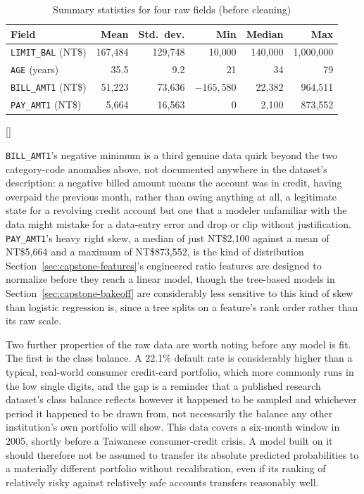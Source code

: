 \documentclass[../ai_in_finance]{subfiles}
\begin{document}
\begin{table}[htbp]
\centering
\begin{lrbox}{\bookmeasuredbox}
\begin{tabular}{lrrrrr}
\toprule
Field & Mean & Std.\ dev. & Min & Median & Max \\
\midrule
\texttt{LIMIT\_BAL} (NT\$) & 167{,}484 & 129{,}748 & 10{,}000 & 140{,}000 & 1{,}000{,}000 \\
\texttt{AGE} (years) & 35.5 & 9.2 & 21 & 34 & 79 \\
\texttt{BILL\_AMT1} (NT\$) & 51{,}223 & 73{,}636 & $-165{,}580$ & 22{,}382 & 964{,}511 \\
\texttt{PAY\_AMT1} (NT\$) & 5{,}664 & 16{,}563 & 0 & 2{,}100 & 873{,}552 \\
\bottomrule
\end{tabular}
\end{lrbox}
\ifdim\wd\bookmeasuredbox<0.65\linewidth
\setlength{\bookcapwidth}{0.65\linewidth}
\else
\setlength{\bookcapwidth}{\wd\bookmeasuredbox}
\fi
{}[\bookcapwidth]{
\usebox{\bookmeasuredbox}
}{
\caption{Summary statistics for four raw fields (before cleaning)}
\label{tab:capstone_summary}
}
\end{table}

\texttt{BILL\_AMT1}'s negative minimum is a third genuine data quirk beyond the two category-code anomalies above, not documented anywhere in the dataset's description: a negative billed amount means the account was in credit, having overpaid the previous month, rather than owing anything at all, a legitimate state for a revolving credit account but one that a modeler unfamiliar with the data might mistake for a data-entry error and drop or clip without justification. \texttt{PAY\_AMT1}'s heavy right skew, a median of just NT\$2,100 against a mean of NT\$5,664 and a maximum of NT\$873,552, is the kind of distribution Section~\ref{sec:capstone-features}'s engineered ratio features are designed to normalize before they reach a linear model, though the tree-based models in Section~\ref{sec:capstone-bakeoff} are considerably less sensitive to this kind of skew than logistic regression is, since a tree splits on a feature's rank order rather than its raw scale.

Two further properties of the raw data are worth noting before any model is fit. The first is the class balance. A 22.1\% default rate is considerably higher than a typical, real-world consumer credit-card portfolio, which more commonly runs in the low single digits, and the gap is a reminder that a published research dataset's class balance reflects however it happened to be sampled and whichever period it happened to be drawn from, not necessarily the balance any other institution's own portfolio will show. This data covers a six-month window in 2005, shortly before a Taiwanese consumer-credit crisis. A model built on it should therefore not be assumed to transfer its absolute predicted probabilities to a materially different portfolio without recalibration, even if its ranking of relatively risky against relatively safe accounts transfers reasonably well.
\end{document}
